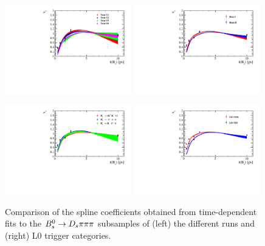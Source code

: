 
\begin{figure}[h]
\includegraphics[height=!,width=0.49\textwidth]{figs/Acceptance/timeAcc_comparison_by_year_t1_adaptive_N4.pdf}
\includegraphics[height=!,width=0.49\textwidth]{figs/Acceptance/timeAcc_comparison_by_run_adaptive_N4.pdf}

\includegraphics[height=!,width=0.49\textwidth]{figs/Acceptance/timeAcc_comparison_by_DsFinalState_mod_adaptive_N4.pdf}
\includegraphics[height=!,width=0.49\textwidth]{figs/Acceptance/timeAcc_comparison_by_trigger_adaptive_N4.pdf}
\caption{Comparison of the spline coefficients obtained from time-dependent fits to the ${{B}^0_{s}}\rightarrow{\ensuremath{{D}_{s}}}{\ensuremath{\pi}}{\ensuremath{\pi}}{\ensuremath{\pi}}$ subsamples of (left) the different runs and (right) L0 trigger categories.}
\label{fig:AccCompRunTrig}
\end{figure}

